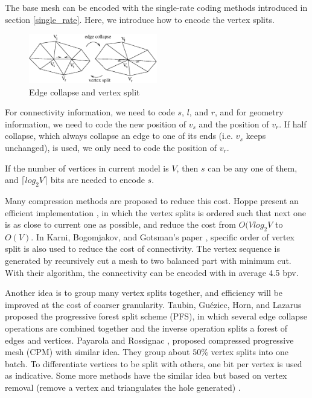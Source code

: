 \documentclass[11pt, a4paper]{report}
\begin{document}
    The base mesh can be encoded with the single-rate coding methods
    introduced in section \ref{single_rate}. Here, we introduce
    how to encode the vertex splits. 
\begin{figure}
\centering
\includegraphics[width=0.5\textwidth]{split2.eps}
\caption{Edge collapse and vertex split}\label{split2}
\end{figure}
    For connectivity
    information, we need to code $s$, $l$, and $r$, and for geometry
    information, we need to code the new position of $v_{s}$ and the
    position of $v_{r}$. If half collapse, which always collapse an
    edge to one of its ends (i.e. $v_{s}$ keeps unchanged), is used, 
    we only need to code the position of $v_r$. 
    
    If the number of vertices in current model is
    $V$, then $s$ can be any one of them, 
    and ${\lceil}log_{2}V{\rceil}$ bits are needed to encode $s$. 
    
    Many compression methods are proposed to reduce this cost.
    Hoppe \cite{efficient:hoppe} present an efficient implementation
    , in which the vertex splits is ordered such that next one
    is as close to current one as possible, and reduce the cost
    from $O(Vlog_{2}V$ to $O(V)$.
    In Karni, Bogomjakov, and Gotsman's paper \cite{602153}, 
    specific order of vertex split is also used to reduce the cost of connectivity. 
    The vertex sequence is generated by recursively cut a mesh to two
    balanced part with minimum cut. With their algorithm, the connectivity can
    be encoded with in average 4.5 bpv. 

    Another idea is to group many vertex splits together, 
    and efficiency will be improved at the cost of coarser granularity. 
    Taubin, Gu\'{e}ziec, Horn, and Lazarus \cite{280834} proposed the
    progressive forest split scheme (PFS), in which several edge
    collapse operations are combined together and the inverse operation splits a
    forest of edges and vertices. 
    Payarola and Rossignac \cite{614450}, 
    proposed compressed progressive mesh (CPM)\label{cpm} with similar
    idea. They group about $50\%$ vertex splits into one batch. To
    differentiate vertices to be split with others, one bit per vertex
    is used as indicative. 
    Some more methods have the similar idea
    but based on vertex removal (remove a vertex and triangulates the hole
    generated) \cite{319358}. 
\end{document}
